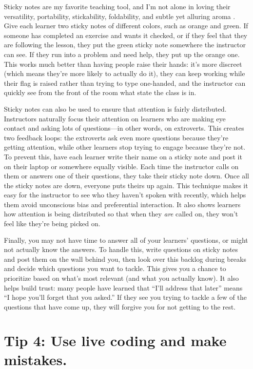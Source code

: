 \documentclass[10pt,letterpaper]{article}
\newcommand{\rulemajor}[1]{\section{#1}}
\begin{document}
Sticky notes are my favorite teaching tool,
and I'm not alone in loving their versatility,
portability, stickability, foldability,
and subtle yet alluring aroma \cite{Ward2015}.
Give each learner two sticky notes of different colors,
such as orange and green.
If someone has completed an exercise and wants it checked,
or if they feel that they are following the lesson,
they put the green sticky note somewhere the instructor can see.
If they run into a problem and need help,
they put up the orange one.
This works much better than having people raise their hands:
it's more discreet (which means they're more likely to actually do it),
they can keep working while their flag is raised rather than trying to type one-handed,
and the instructor can quickly see from the front of the room what state the class is in.

Sticky notes can also be used to ensure that attention is fairly distributed.
Instructors naturally focus their attention on learners
who are making eye contact and asking lots of questions---in other words, on extroverts.
This creates two feedback loops:
the extroverts ask even more questions because they're getting attention,
while other learners stop trying to engage because they're not.
To prevent this,
have each learner write their name on a sticky note
and post it on their laptop or somewhere equally visible.
Each time the instructor calls on them or answers one of their questions,
they take their sticky note down.
Once all the sticky notes are down,
everyone puts theirs up again.
This technique makes it easy for the instructor to see who they haven't spoken with recently,
which helps them avoid unconscious bias and preferential interaction.
It also shows learners how attention is being distributed
so that when they \emph{are} called on,
they won't feel like they're being picked on.

Finally,
you may not have time to answer all of your learners' questions,
or might not actually know the answers.
To handle this,
write questions on sticky notes and post them on the wall behind you,
then look over this backlog during breaks and decide which questions you want to tackle.
This gives you a chance to prioritize based on what's most relevant (and what you actually know).
It also helps build trust:
many people have learned that ``I'll address that later''
means ``I hope you'll forget that you asked.''
If they see you trying to tackle a few of the questions that have come up,
they will forgive you for not getting to the rest.

\rulemajor{Tip 4: Use live coding and make mistakes.}
\end{document}
